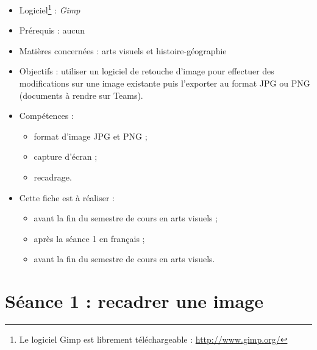 {\footnotesize
\begin{itemize}
\item Logiciel\footnote{Le logiciel Gimp est librement téléchargeable : \url{http://www.gimp.org/}} : \emph{Gimp}
\item Prérequis : aucun
\item Matières concernées : arts visuels et histoire-géographie
\item Objectifs : utiliser un logiciel de retouche d'image pour effectuer des modifications sur une image existante puis l'exporter au format JPG ou PNG (documents à rendre sur Teams).
\item Compétences : 
        \begin{itemize}
        \item format d'image JPG et PNG ;
        \item capture d'écran ;
        \item recadrage.
        \end{itemize}
\item Cette fiche est à réaliser :
        \begin{itemize}
        \item avant la fin du semestre de cours en arts visuels ;
        \item après la séance 1 en français  ;
        \item avant la fin du semestre de cours en arts visuels. 
        \end{itemize}
\end{itemize}
}




\newpage

\section{Séance 1 : recadrer une image}

